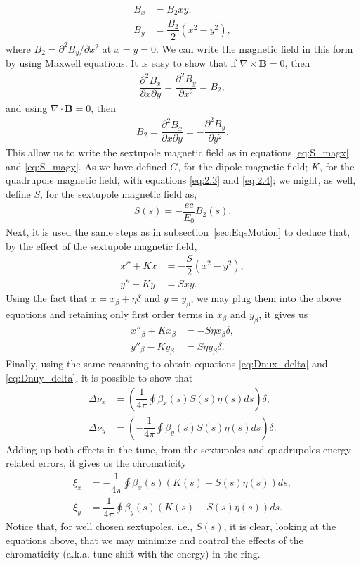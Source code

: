 \begin{align}
	B_x &= B_2 x y, \label{eq:S_magx} \\ 
    B_y &= \dfrac{B_2}{2} (x^2 - y^2),\label{eq:S_magy}
\end{align}
where $B_2 = \partial^2 B_y/\partial x^2$ at $x=y=0$. We can write the magnetic field in this form by using Maxwell equations. It is easy to show that if $\nabla \times \bm{B} = 0$, then
\begin{align*}
	\dfrac{\partial^2 B_x}{\partial x \partial y} = \dfrac{\partial^2 B_y}{\partial x^2} = B_2, 
\end{align*}
and using $\nabla \cdot \bm{B} = 0$, then
\begin{align*}
	B_2 = \dfrac{\partial^2 B_x}{\partial x \partial y} = - \dfrac{\partial^2 B_y}{\partial y^2}.
\end{align*}
This allow us to write the sextupole magnetic field as in equations \eqref{eq:S_magx} and \eqref{eq:S_magy}.
As we have defined $G$, for the dipole magnetic field; $K$, for the quadrupole magnetic field, with equations \eqref{eq:2.3} and \eqref{eq:2.4}; we might, as well, define $S$, for the sextupole magnetic field as,
\begin{align}
	S(s) = -\dfrac{ec}{E_0} B_2(s).
\end{align}
Next, it is used the same steps as in subsection~\ref{sec:EqsMotion} to deduce that, by the effect of the sextupole magnetic field,
\begin{align}
	x''+ K x &= - \dfrac{S}{2} (x^2 - y^2),\\
    y''- K y &= S x y.
\end{align}
Using the fact that $x = x_{\beta} + \eta \delta$ and $y = y_{\beta}$, we may plug them into the above equations and retaining only first order terms in $x_{\beta}$ and $y_{\beta}$, it gives us
\begin{align}
	x''_{\beta} + K x_{\beta} &= - S \eta x_{\beta} \delta, \\
    y''_{\beta} - K y_{\beta} &= S \eta y_{\beta} \delta.
\end{align}
Finally, using the same reasoning to obtain equations \eqref{eq:Dnux_delta} and \eqref{eq:Dnuy_delta}, it is possible to show that
\begin{align}
	\Delta\nu_x &= \left( \dfrac{1}{4\pi}\oint\beta_x(s) S(s)\eta(s) ds \right) \delta,\\
    \Delta\nu_y &= \left( -\dfrac{1}{4\pi}\oint\beta_y(s) S(s)\eta(s) ds \right) \delta.
\end{align}
Adding up both effects in the tune, from the sextupoles and quadrupoles energy related errors, it gives us the chromaticity
\begin{align}
	\xi_x &= -\dfrac{1}{4\pi}\oint\beta_x(s)(K(s) - S(s)\eta(s)) ds, \\
    \xi_y &= \dfrac{1}{4\pi}\oint\beta_y(s)(K(s) - S(s)\eta(s)) ds.
\end{align}
Notice that, for well chosen sextupoles, i.e., $S(s)$, it is clear, looking at the equations above, that we may minimize and control the effects of the chromaticity (a.k.a. tune shift with the energy) in the ring.
